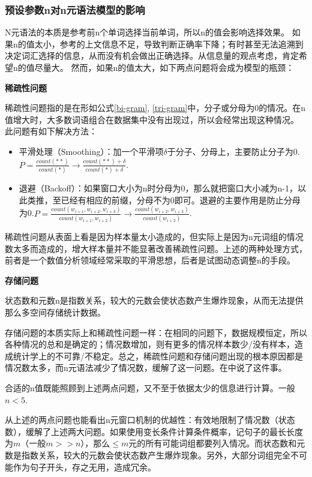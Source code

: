 \subsubsection{预设参数n对n元语法模型的影响}

N元语法的本质是参考前n个单词选择当前单词，所以n的值会影响选择效果。
如果n的值太小，参考的上文信息不足，导致判断正确率下降；有时甚至无法追溯到决定词汇选择的信息，从而没有机会做出正确选择。从信息量的观点考虑，肯定希望n的值尽量大。
然而，如果n的值太大，如下两点问题将会成为模型的瓶颈：

\textbf{稀疏性问题}

稀疏性问题指的是在形如公式\ref{bi-gram}, \ref{tri-gram}中，分子或分母为0的情况。在n值增大时，大多数词语组合在数据集中没有出现过，所以会经常出现这种情况。
此问题有如下解决方法：

\begin{itemize}
    \item 平滑处理（Smoothing）：加一个平滑项$\delta$于分子、分母上，主要防止分子为0.$P = \frac{count(**)}{count(*)}\to\frac{count(**)+\delta}{count(*)+\delta}$.
    \item 退避（Backoff）：如果窗口大小为n时分母为0，那么就把窗口大小减为n-1，以此类推，至已经有相应的前缀，分母不为0即可。退避的主要作用是防止分母为0.$P = \frac{count(w_{i + 1}, w_{i + 2}, w_{i + 3})}{count(w_{i + 1}, w_{i + 2})}\to\frac{count(w_{i + 2}, w_{i + 3})}{count(w_{i + 2})}$.
\end{itemize}

稀疏性问题从表面上看是因为样本量太小造成的，但实际上是因为n元词组的情况数太多而造成的，增大样本量并不能显著改善稀疏性问题。上述的两种处理方式，前者是一个数值分析领域经常采取的平滑思想，后者是试图动态调整n的手段。

\textbf{存储问题}

状态数和元数n是指数关系，较大的元数会使状态数产生爆炸现象，从而无法提供那么多空间存储统计数据。

存储问题的本质实际上和稀疏性问题一样：在相同的问题下，数据规模恒定，所以各种情况的总和是确定的；情况数增加，则有更多的情况样本数少/没有样本，造成统计学上的不可靠/不稳定。总之，稀疏性问题和存储问题出现的根本原因都是情况数太多，而n元语法减少了情况数，缓解了这一问题。在\cite{05-tj-qk}中说了这件事。

合适的n值既能照顾到上述两点问题，又不至于依据太少的信息进行计算。一般$n<5$.

从上述的两点问题也能看出n元窗口机制的优越性：有效地限制了情况数（状态数），缓解了上述两大问题。如果使用变长条件计算条件概率，记句子的最长长度为$m$（一般$m>>n$），那么$\leq m$元的所有可能词组都要列入情况。而状态数和元数是指数关系，较大的元数会使状态数产生爆炸现象。另外，大部分词组完全不可能作为句子开头，存之无用，造成冗余。

